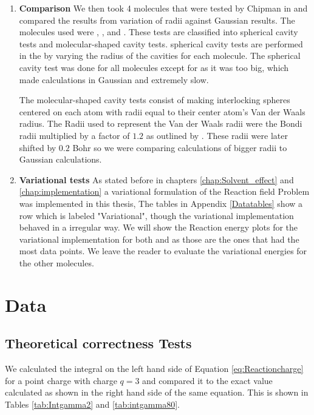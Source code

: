 \documentclass[../master_thesis.tex]{subfiles}
\begin{document}
\begin{enumerate}
\item \textbf{Comparison} We then took 4 molecules that were tested by Chipman in \cite{Chipman2002} and compared the
results from variation of radii against Gaussian results. The molecules used
were , ,  and . These tests are classified into
spherical cavity tests and molecular-shaped cavity tests. spherical cavity tests are performed in the
by varying the radius of the cavities for each molecule. The spherical cavity test was done for
all molecules except for  as it was too big, which made calculations
in Gaussian and \mrchem extremely slow.

The molecular-shaped cavity tests consist of making interlocking spheres centered on
each atom with radii equal to their center atom's Van der Waals radius. The Radii
used to represent the Van der Waals radii were the Bondi radii multiplied by a factor of
$1.2$ as outlined by \cite{Tomasi:1994wt}. These radii were later shifted by $0.2$ Bohr
so we were comparing \mrchem calculations of bigger radii to Gaussian calculations.

\item \textbf{Variational tests} As stated before in chapters \ref{chap:Solvent_effect} and \ref{chap:implementation}
a variational formulation of the Reaction field Problem was implemented in this thesis,
The tables in Appendix \ref{Datatables} show a row which is labeled "Variational",
though the variational implementation behaved in a irregular way. We will show
the Reaction energy plots for the variational implementation for both 
and  as those are the ones that had the most data points. We leave the
reader to evaluate the variational energies for the other molecules.

\end{enumerate}

\section{Data}
\subsection{Theoretical correctness Tests}
We calculated the integral on the left hand side of Equation \ref{eq:Reactioncharge} for a point charge
with charge $q=3$ and compared it to the exact value calculated as shown in the right hand side of the same
equation. This is shown in Tables \ref{tab:Intgamma2} and \ref{tab:intgamma80}.
\end{document}
